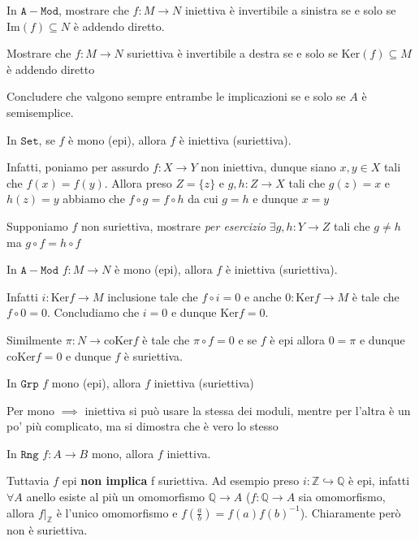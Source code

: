 \begin{eser}{}
    In \(\mathtt{A-Mod}\), mostrare che \(f : M\to N\) iniettiva è invertibile a
    sinistra se e solo se \(\mathrm{Im}{(f)} \subseteq N \) è addendo diretto.

    Mostrare che \(f : M \to N\) suriettiva è invertibile a destra se e solo se
    \(\mathrm{Ker}{(f)} \subseteq M \) è addendo diretto

    Concludere che valgono sempre entrambe le implicazioni se e solo se \(A\) è
    semisemplice.
\end{eser}

\begin{example}{}
    In \(\mathtt{Set}\), se \(f\) è mono (epi), allora \(f\) è iniettiva
    (suriettiva).

    Infatti, poniamo per assurdo \(f : X \to Y\) non iniettiva, dunque siano \(x, y \in X\) tali che \(f{(x)} = f{(y)}\). Allora preso \(Z = \{z\} \) e \(g, h : Z\to X\) tali che \(g
    {(z)} = x\) e \(h{(z)} = y\) abbiamo che \(f \circ g = f \circ h\) da cui \(g = h\) e dunque \(x = y\) 

    Supponiamo \(f\) non suriettiva, mostrare \emph{per esercizio} \(\exists g, h : Y \to Z\) tali che
    \(g \neq h\) ma \(g \circ f = h \circ f\) 
\end{example}

\begin{example}{}
    In \(\mathtt{A-Mod}\) \(f : M \to N\) è mono (epi), allora \(f\) è iniettiva (suriettiva).

    Infatti \(i : \mathrm{Ker}f \to M\) inclusione tale che \(f \circ i = 0\) e
    anche \(0 : \mathrm{Ker}f \to M\) è tale che \(f \circ 0 = 0\). Concludiamo
    che \(i = 0\) e dunque \(\mathrm{Ker}f = 0\).

    Similmente \(\pi : N \to \mathrm{coKer}f\) è tale che \(\pi \circ f = 0\) e
    se \(f\) è epi allora \(0 = \pi \) e dunque \(\mathrm{coKer} f= 0\) e dunque
    \(f\) è suriettiva.
\end{example}

\begin{example}{}
    In \(\mathtt{Grp}\) \(f\) mono (epi), allora \(f\) iniettiva (suriettiva)

    Per mono \(\implies \) iniettiva si può usare la stessa dei moduli, mentre
    per l'altra è un po' più complicato, ma si dimostra che è vero lo stesso
\end{example}

\begin{example}{}
    In \(\mathtt{Rng}\) \(f : A\to B\) mono, allora \(f\) iniettiva. %

    Tuttavia \(f\) epi \textbf{non implica} f suriettiva. Ad esempio preso \(i :
    \mathbb{Z} \hookrightarrow \mathbb{Q}\) è epi, infatti \(\forall A\) anello
    esiste al più un omomorfismo \(\mathbb{Q} \to A\) (\(f : \mathbb{Q}\to A\)
    sia omomorfismo, allora \(f|_{\mathbb{Z}} \) è l'unico omomorfismo e \(f{(\frac{a}{b})} = f{(a)}f{(b)}^{-1}\)). Chiaramente però non è suriettiva.
\end{example}

